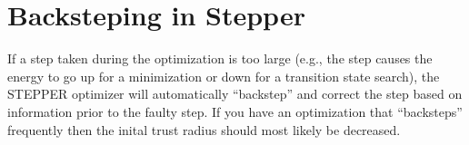 %
%
%
%
%


\section{Backsteping in Stepper}

If a step taken during the optimization is too large (e.g., the step
causes the energy to go up for a minimization or down for a transition
state search), the STEPPER optimizer will automatically ``backstep''
and correct the step based on information prior to the faulty step.
If you have an optimization that ``backsteps'' frequently then the
inital trust radius should most likely be decreased.



